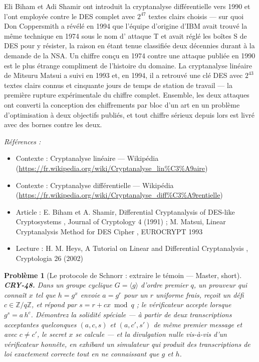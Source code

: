 \documentclass[11pt]{article}
\newtheorem{problem}{Problème}
\newenvironment{refs}{\par\small\noindent\emph{Références :}\begin{itemize}\setlength\itemsep{0pt}}{\end{itemize}\normalsize}
\begin{document}
\noindent Eli Biham et Adi Shamir ont introduit la cryptanalyse différentielle vers
1990 et l'ont employée contre le DES complet avec $2^{47}$ textes clairs choisis --- sur quoi
Don Coppersmith a révélé en 1994 que l'équipe d'origine d'IBM avait trouvé la même technique
en 1974 sous le nom d'\og{} attaque T \fg{} et avait réglé les boîtes S de DES pour y résister, la
raison en étant tenue classifiée deux décennies durant à la demande de la NSA. Un chiffre
conçu en 1974 contre une attaque publiée en 1990 est le plus étrange compliment de l'histoire
du domaine. La cryptanalyse linéaire de Mitsuru Matsui a suivi en 1993 et, en 1994, il a
retrouvé une clé DES avec $2^{43}$ textes clairs connus et cinquante jours de temps de
station de travail --- la première rupture expérimentale du chiffre complet. Ensemble, les deux
attaques ont converti la conception des chiffrements par bloc d'un art en un problème
d'optimisation à deux objectifs publiés, et tout chiffre sérieux depuis lors est livré avec
des bornes contre les deux.

\begin{refs}
\item Contexte : Cryptanalyse linéaire --- Wikipédia (\url{https://fr.wikipedia.org/wiki/Cryptanalyse_lin%C3%A9aire})
\item Contexte : Cryptanalyse différentielle --- Wikipédia (\url{https://fr.wikipedia.org/wiki/Cryptanalyse_diff%C3%A9rentielle})
\item Article : E. Biham et A. Shamir, \og{} Differential Cryptanalysis of DES-like Cryptosystems \fg{}, Journal of Cryptology 4 (1991) ; M. Matsui, \og{} Linear Cryptanalysis Method for DES Cipher \fg{}, EUROCRYPT 1993
\item Lecture : H. M. Heys, \og{} A Tutorial on Linear and Differential Cryptanalysis \fg{}, Cryptologia 26 (2002)
\end{refs}

\bigskip

\begin{problem}[{Le protocole de Schnorr : extraire le témoin --- Master, short}]
\textbf{CRY-48.} Dans un groupe cyclique $G = \langle g \rangle$ d'ordre
premier $q$, un prouveur qui connaît $x$ tel que $h = g^x$ envoie $a = g^r$ pour un
$r$ uniforme frais, reçoit un défi $c \in \mathbb{Z}/q\mathbb{Z}$, et répond par
$s = r + cx \bmod q$ ; le vérificateur accepte lorsque $g^s = a\,h^c$. Démontrez la
\textit{solidité spéciale} --- à partir de deux transcriptions acceptantes quelconques
$(a,c,s)$ et $(a,c',s')$ de même premier message et avec $c \ne c'$, le secret $x$ se
calcule --- et la \textit{divulgation nulle vis-à-vis d'un vérificateur honnête}, en exhibant un
simulateur qui produit des transcriptions de loi exactement correcte tout en ne connaissant
que $g$ et $h$.
\end{problem}
\end{document}
